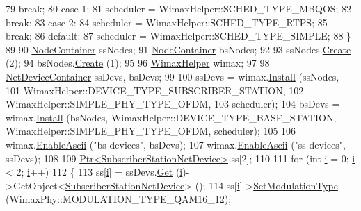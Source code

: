 \begin{DoxyCode}
79       \textcolor{keywordflow}{break};
80     \textcolor{keywordflow}{case} 1:
81       scheduler = WimaxHelper::SCHED\_TYPE\_MBQOS;
82       \textcolor{keywordflow}{break};
83     \textcolor{keywordflow}{case} 2:
84       scheduler = WimaxHelper::SCHED\_TYPE\_RTPS;
85       \textcolor{keywordflow}{break};
86     \textcolor{keywordflow}{default}:
87       scheduler = WimaxHelper::SCHED\_TYPE\_SIMPLE;
88     \}
89 
90   \hyperlink{classns3_1_1NodeContainer}{NodeContainer} ssNodes;
91   \hyperlink{classns3_1_1NodeContainer}{NodeContainer} bsNodes;
92 
93   ssNodes.\hyperlink{classns3_1_1NodeContainer_a787f059e2813e8b951cc6914d11dfe69}{Create} (2);
94   bsNodes.\hyperlink{classns3_1_1NodeContainer_a787f059e2813e8b951cc6914d11dfe69}{Create} (1);
95 
96   \hyperlink{classns3_1_1WimaxHelper}{WimaxHelper} wimax;
97 
98   \hyperlink{classns3_1_1NetDeviceContainer}{NetDeviceContainer} ssDevs, bsDevs;
99 
100   ssDevs = wimax.\hyperlink{classns3_1_1WimaxHelper_a9f0848e09c4b6db9cdde9872b38f6349}{Install} (ssNodes,
101                           WimaxHelper::DEVICE\_TYPE\_SUBSCRIBER\_STATION,
102                           WimaxHelper::SIMPLE\_PHY\_TYPE\_OFDM,
103                           scheduler);
104   bsDevs = wimax.\hyperlink{classns3_1_1WimaxHelper_a9f0848e09c4b6db9cdde9872b38f6349}{Install} (bsNodes, WimaxHelper::DEVICE\_TYPE\_BASE\_STATION, 
      WimaxHelper::SIMPLE\_PHY\_TYPE\_OFDM, scheduler);
105 
106   wimax.\hyperlink{classns3_1_1AsciiTraceHelperForDevice_a3101b30e635f717bddf0e5764912fec1}{EnableAscii} (\textcolor{stringliteral}{"bs-devices"}, bsDevs);
107   wimax.\hyperlink{classns3_1_1AsciiTraceHelperForDevice_a3101b30e635f717bddf0e5764912fec1}{EnableAscii} (\textcolor{stringliteral}{"ss-devices"}, ssDevs);
108 
109   \hyperlink{classns3_1_1Ptr}{Ptr<SubscriberStationNetDevice>} ss[2];
110 
111   \textcolor{keywordflow}{for} (\textcolor{keywordtype}{int} \hyperlink{bernuolliDistribution_8m_a6f6ccfcf58b31cb6412107d9d5281426}{i} = 0; \hyperlink{bernuolliDistribution_8m_a6f6ccfcf58b31cb6412107d9d5281426}{i} < 2; \hyperlink{bernuolliDistribution_8m_a6f6ccfcf58b31cb6412107d9d5281426}{i}++)
112     \{
113       ss[\hyperlink{bernuolliDistribution_8m_a6f6ccfcf58b31cb6412107d9d5281426}{i}] = ssDevs.\hyperlink{classns3_1_1NetDeviceContainer_a677d62594b5c9d2dea155cc5045f4d0b}{Get} (\hyperlink{bernuolliDistribution_8m_a6f6ccfcf58b31cb6412107d9d5281426}{i})->GetObject<\hyperlink{classns3_1_1SubscriberStationNetDevice}{SubscriberStationNetDevice}> ();
114       ss[\hyperlink{bernuolliDistribution_8m_a6f6ccfcf58b31cb6412107d9d5281426}{i}]->\hyperlink{classns3_1_1SubscriberStationNetDevice_af6d2d096d7cac7ab7c9a08d0133c64e1}{SetModulationType} (WimaxPhy::MODULATION\_TYPE\_QAM16\_12);

\end{DoxyCode}
